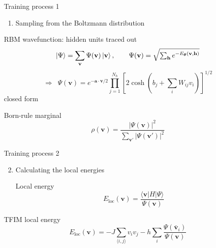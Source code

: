 \documentclass[18pt,aspectratio=169]{beamer}
\begin{document}
\begin{frame}{Training process 1}
\small
\begin{enumerate}
    \item Sampling from the Boltzmann distribution
\end{enumerate}
\begin{block}{RBM wavefunction: hidden units traced out}
\begin{equation*}
\ket{\Psi} = \sum_{\mathbf v} \Psi(\mathbf v)\ket{\mathbf v}, \qquad
\Psi(\mathbf{v})=\sqrt{\textstyle\sum_{\mathbf h} e^{-E_{\boldsymbol\theta}(\mathbf v,\mathbf h)}}
\end{equation*}
\begin{equation*}
\Longrightarrow\;\;
\Psi(\mathbf{v}) = e^{-\mathbf{a}\cdot \mathbf{v}/2} \prod_{j=1}^{N_h} \left[ 2\cosh\!\left(b_j + \textstyle\sum_i W_{ij} v_i\right) \right]^{1/2}
\end{equation*}
{\scriptsize closed form~\cite{Carleo_2017}}
\end{block}
\begin{block}{Born-rule marginal}
\begin{equation*}
    \rho(\mathbf{v})=\frac{|\Psi(\mathbf{v})|^2}{\sum_{\mathbf{v}'}|\Psi(\mathbf{v}')|^2}
\end{equation*}
\end{block}
\end{frame}

\begin{frame}{Training process 2}
\begin{enumerate}
\setcounter{enumi}{1}
    \item Calculating the local energies
    \begin{block}{Local energy~\cite{Gardas_2018}}
    \begin{equation*}
        E_\text{loc}(\mathbf v)=\frac{\langle \mathbf v|H|\Psi\rangle}{\Psi(\mathbf v)}
    \end{equation*}
    \end{block}
\end{enumerate}
\begin{block}{TFIM local energy~\cite{Gardas_2018,Carleo_2017}}
\begin{equation*}
    E_\text{loc}(\mathbf v) = -J\sum_{\langle i,j\rangle} v_i v_j - h\sum_i \frac{\Psi(\bar{\mathbf v}_i)}{\Psi(\mathbf v)}
\end{equation*}
\end{block}
\end{frame}
\end{document}
